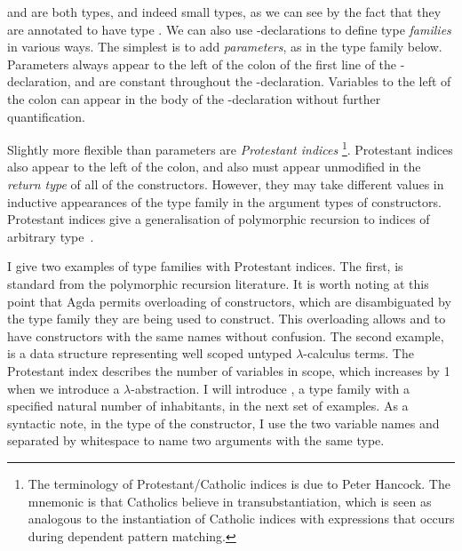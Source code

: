  and  are both types, and indeed
small types, as we can see by the fact that they are annotated to have type
.
We can also use -declarations to define type \emph{families}
in various ways.
The simplest is to add \emph{parameters}, as in the type family
 below.
Parameters always appear to the left of the colon of the first line of the
-declaration, and are constant throughout the
-declaration.
Variables to the left of the colon can appear in the body of the
-declaration without further quantification.


Slightly more flexible than parameters are \emph{Protestant indices}%
\footnote{The terminology of Protestant/Catholic indices is due to Peter
  Hancock. The mnemonic is that Catholics believe in transubstantiation, which
  is seen as analogous to the instantiation of Catholic indices with expressions
  that occurs during dependent pattern matching.}.
Protestant indices also appear to the left of the colon, and also must appear
unmodified in the \emph{return type} of all of the constructors.
However, they may take different values in inductive appearances of the type
family in the argument types of constructors.
Protestant indices give a generalisation of polymorphic
recursion to indices of arbitrary type~\citep{Mycroft84,Henglein93}.

I give two examples of type families with Protestant indices.
The first,  is standard from the polymorphic recursion
literature.
It is worth noting at this point that Agda permits overloading of constructors,
which are disambiguated by the type family they are being used to construct.
This overloading allows  and  to
have constructors with the same names without confusion.
The second example,  is a data structure representing
well scoped untyped $\lambda$-calculus terms.
The Protestant index  describes the number of variables in scope,
which increases by 1 when we introduce a $\lambda$-abstraction.
I will introduce , a type family with a specified natural
number of inhabitants, in the next set of examples.
As a syntactic note, in the type of the 
constructor, I use the two variable names  and 
separated by whitespace to name two arguments with the same type.

